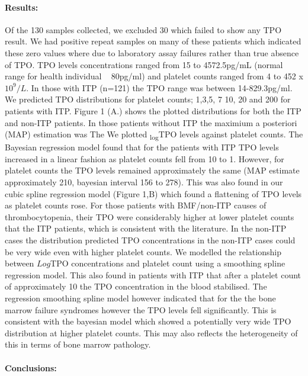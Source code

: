 \documentclass[11pt]{article}
\begin{document}
\paragraph{Results:} Of the 130 samples collected, we excluded 30 which failed to show any TPO result. We had positive repeat samples on many of these patients which indicated these zero values where due to laboratory assay failures rather than true absence of TPO. TPO levels concentrations ranged from 15 to 4572.5pg/mL (normal range for health individual ~ 80pg/ml) and platelet counts ranged from 4 to 452 x$10^9/L$. In those with ITP (n=121) the TPO range was between 14-829.3pg/ml. We predicted TPO distributions for platelet counts; 1,3,5, 7 10, 20 and 200 for patients with ITP. Figure 1 (A.) shows the plotted distributions for both the ITP and non-ITP patients. In those patients without ITP the maximium a posteriori (MAP) estimation was  The We plotted \textsubscript{log}TPO levels against platelet counts.  The Bayesian regression model found that for the patients with ITP TPO levels increased in a linear fashion as platelet counts fell from 10 to 1. However, for platelet counts  the TPO levels remained approximately the same (MAP estimate approximately 210, bayesian interval 156 to 278). This was also found in our cubic spline regression model (Figure 1,B) which found a flattening of TPO levels as platelet counts rose. For those patients with BMF/non-ITP causes of thrombocytopenia, their TPO were considerably higher at lower platelet counts that the ITP patients, which is consistent with the literature.  In the non-ITP cases the distribution predicted TPO concentrations in the non-ITP cases could be very wide even with higher platelet counts. We modelled the relationship between $Log$TPO concentrations and platelet count using a smoothing spline regression model. This also found in patients with ITP that after a platelet count of approximately 10 the TPO concentration in the blood stabilised. The regression smoothing spline model however indicated that for the the bone marrow failure syndromes however the TPO levels fell significantly. This is consistent with the bayesian model which showed a potentially very wide TPO distribution at higher platelet counts. This may also reflects the heterogeneity of this in terms of bone marrow pathology.
\paragraph{Conclusions:}
\end{document}
